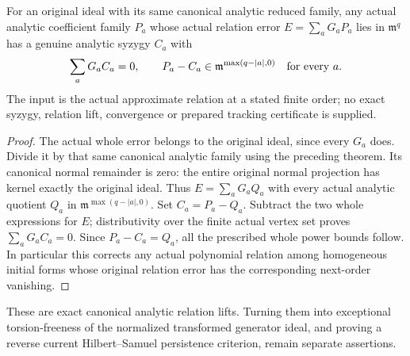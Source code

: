 \begin{theorem}
\label{hir:actual-original-canonical-analytic-syzygy-lifting}
\leanok
For an original ideal with its same canonical analytic reduced family,
any actual analytic coefficient family $P_a$ whose actual relation error
$E=\sum_aG_aP_a$ lies in $\mathfrak m^q$ has a genuine analytic syzygy
$C_a$ with
\[
 \sum_aG_aC_a=0,\qquad
 P_a-C_a\in\mathfrak m^{\max(q-|a|,0)}\quad\hbox{for every }a.
\]
The input is the actual approximate relation at a stated finite order;
no exact syzygy, relation lift, convergence or prepared tracking
certificate is supplied.
\end{theorem}
\begin{proof}
The actual whole error belongs to the original ideal, since every $G_a$
does. Divide it by that same canonical analytic family using the preceding
theorem. Its canonical normal remainder is zero: the entire original
normal projection has kernel exactly the original ideal. Thus
$E=\sum_aG_aQ_a$ with every actual analytic quotient $Q_a$ in
$\mathfrak m^{\max(q-|a|,0)}$. Set $C_a=P_a-Q_a$. Subtract the two whole
expressions for $E$; distributivity over the finite actual vertex set
proves $\sum_aG_aC_a=0$. Since $P_a-C_a=Q_a$, all the prescribed whole
power bounds follow. In particular this corrects any actual polynomial
relation among homogeneous initial forms whose original relation error
has the corresponding next-order vanishing.
\end{proof}

These are exact canonical analytic relation lifts. Turning them into
exceptional torsion-freeness of the normalized transformed generator ideal,
and proving a reverse current Hilbert--Samuel persistence criterion,
remain separate assertions.

